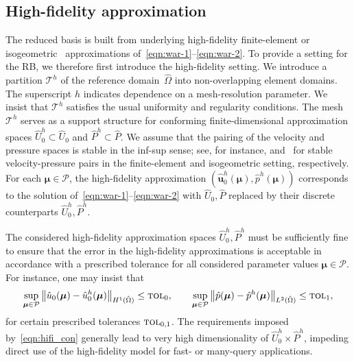 \documentclass[onecolumn, twoside, a4paper, 11pt]{article}
\begin{document}
\subsection{High-fidelity approximation}
The reduced basis is built from underlying high-fidelity finite-element or isogeometric~\cite{Cottrell2009iat}
approximations of~\eqref{eqn:war-1}--\eqref{eqn:war-2}. To provide a setting for the RB, we therefore
first introduce the high-fidelity setting.
We introduce a partition $\mathcal{T}^h$ of the reference domain~$\hat{\Omega}$ into non-overlapping
element domains. The superscript $h$ indicates dependence
on a mesh-resolution parameter. We insist that $\mathcal{T}^h$ satisfies the usual uniformity and
regularity conditions. The mesh $\mathcal{T}^h$ serves as a support structure for conforming
finite-dimensional approximation spaces $\hat{U}_0^h\subset\hat{U}_0$ and $\hat{P}^h\subset\hat{P}$.
We assume that the pairing of the velocity and pressure spaces is stable in the inf-sup sense; see,
for instance, \cite{} and~\cite{} for stable velocity-pressure pairs in the finite-element and isogeometric setting,
respectively. For each $\bm{\mu}\in\mathcal{P}$, the high-fidelity approximation
$(\hat{\bm{u}}_0^h(\bm{\mu}),\hat{p}^h(\bm{\mu}))$ corresponds to the solution
of~\eqref{eqn:war-1}\nobreakdash--\eqref{eqn:war-2} with $\hat{U}_0,\hat{P}$ replaced by their
discrete counterparts $\hat{U}_0^h,\hat{P}^h$.

The considered high-fidelity approximation spaces $\hat{U}_0^h,\hat{P}^h$ must be sufficiently fine to
ensure that the error in the high-fidelity approximations is acceptable in accordance with a prescribed tolerance
for all considered parameter values $\bm{\mu}\in\mathcal{P}$. For instance, one may insist that
%
\begin{equation}
\label{eqn:hifi_con}
\sup_{\bm{\mu}\in\mathcal{P}}
\big\|\hat{u}_0(\bm{\mu})-\hat{u}_0^h(\bm{\mu})\big\|_{H^1(\hat{\Omega})}\leq\textsc{tol}_0,
\qquad
\sup_{\bm{\mu}\in\mathcal{P}}
\big\|\hat{p}(\bm{\mu})-\hat{p}^h(\bm{\mu})\big\|_{L^2(\hat{\Omega})}\leq\textsc{tol}_1,
\end{equation}
%
for certain prescribed tolerances $\textsc{tol}_{0,1}$.
The requirements imposed by~\eqref{eqn:hifi_con} generally lead to very high dimensionality of $\hat{U}_0^h\times\hat{P}^h$,
impeding direct use of the high-fidelity model for fast- or many-query applications.
\end{document}
